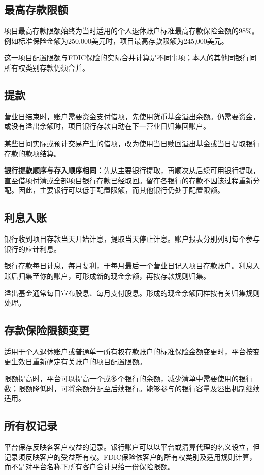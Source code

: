 \documentclass[UTF8,fontset=none,11pt,a4paper]{ctexart}
\begin{document}
\subsection*{最高存款限额}
项目最高存款限额始终为当时适用的个人退休账户标准最高存款保险金额的98\%。例如标准保险金额为250,000美元时，项目最高存款限额为245,000美元。


这一项目配置限额与FDIC保险的实际合并计算是不同事项；本人的其他同银行同所有权类别存款仍须合并。


\subsection*{提款}
营业日结束时，账户需要资金支付借项，先使用货币基金溢出余额。仍需要资金，或没有溢出余额时，项目银行存款自动在下一营业日归集回账户。


某些日间实际或预计交易产生的借项，改为使用当日赎回溢出基金或当日提取银行存款的款项结算。


\textbf{银行提款顺序与存入顺序相同：}先从主要银行提取，再顺次从后续可用银行提取，直至借项付清或全部项目银行存款已经取回。留在各银行的存款不因该过程重新分配。因此，主要银行可以低于配置限额，而其他银行仍处于配置限额。


\subsection*{利息入账}
银行收到项目存款当天开始计息，提取当天停止计息。账户报表分别列明每个参与银行的应计利息。


银行存款每日计息，每月复利，于每月最后一个营业日记入项目存款账户。利息入账后归集至你的账户，可形成新的现金余额，再按存款规则归集。


溢出基金通常每日宣布股息、每月支付股息。形成的现金余额同样按有关归集规则处理。


\subsection*{存款保险限额变更}
适用于个人退休账户或普通单一所有权存款账户的标准保险金额变更时，平台按变更生效日重新确定有关账户的项目配置限额。


限额提高时，平台可以提高一个或多个银行的余额，减少清单中需要使用的银行数；限额降低时，可将余额分配至后续银行。能够参与的银行容量及溢出机制继续适用。


\subsection*{所有权记录}
平台保存反映各客户权益的记录。银行账户可以以平台或清算代理的名义设立，但记录须反映客户的受益所有权。FDIC保险依客户的所有权类别及适用规则计算，而不是对平台名称下所有客户合计只给一份保险限额。
\end{document}
